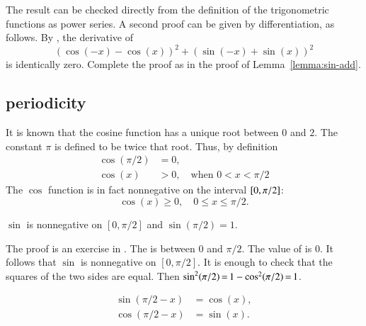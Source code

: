 \begin{proved}
The result can be checked directly from the definition of the trigonometric functions
as power series.  A second proof can be given by differentiation, as follows.
By , the derivative of
\[ 
(\cos(-x) - \cos(x))^2 + (\sin(-x)
  +\sin(x))^2
\] 
is identically zero.  Complete the proof as in the proof of
Lemma~\ref{lemma:sin-add}.  \swallowed\end{proved}

\subsection{periodicity}
\label{sec:pi}
%

It is known that the cosine function has a unique root between $0$
and $2$. The constant $\pi$ is defined to be twice that root.  Thus, by
definition 
\begin{align}\label{eqn:cospi2}
\cos(\pi/2) &= 0,\nonumber\\
\cos(x) &>0,\quad \text{when } 0<x<\pi/2
\end{align}
The $\cos$ function is in fact
nonnegative on the interval $[ 0,\pi/2]$:
\begin{equation}\label{eqn:cospos}
\cos(x)\ge 0,   \quad 0\le x \le \pi/2.
\end{equation}
%

\begin{lemma}[]\label{lemma:sin-pi2}
$\sin$ is nonnegative on $[0,\pi/2]$ and  $\sin (\pi/2) = 1.$
\end{lemma}

\begin{proved}
  The proof is an exercise in .
  The  is
   between $0$ and $\pi/2$.  The
  value of  is $0$.  It follows that
  $\sin$ is nonnegative on $[0,\pi/2]$.  It is enough to check that
  the squares of the two sides are equal.  Then $\sin^2(\pi/2)
  \hypermark[lemma:circle]{\,=\,} {1-\cos^2(\pi/2)}
  \hypermark[eqn:cospi2]{\,=\,} 1$.  \swallowed\end{proved}

\begin{lemma}[]\label{lemma:cos-sin}
\begin{align*}
\sin(\pi/2 - x)&=\cos(x),\\
\cos(\pi/2 - x)&=\sin(x).
\end{align*}
\end{lemma}

